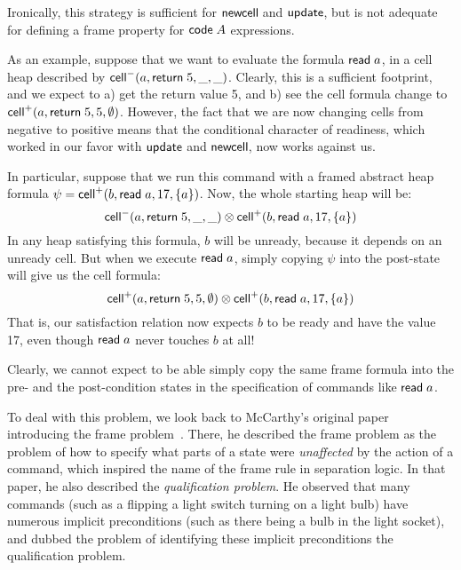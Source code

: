 Ironically, this strategy is sufficient for $\mathsf{newcell}\;$and
$\mathsf{update}$, but is not adequate for defining a frame property
for $\mathsf{code}\;{A}$ expressions. 

As an example, suppose that we want to evaluate the formula $\mathsf{read}\;
a$, in a cell heap described by $\mathsf{cell}^{-}({a}, {\mathsf{return}\; 5}, {\_}, {\_})$.  Clearly,
this is a sufficient footprint, and we expect to a) get the return
value 5, and b) see the cell formula change to $\mathsf{cell}^{+}({a}, {\mathsf{return}\;
  5}, {5}, {\emptyset})$.  However, the fact that we are now changing cells
from negative to positive means that the conditional character of
readiness, which worked in our favor with $\mathsf{update}$ and
$\mathsf{newcell}\;\!\!$, now works against us.

In particular, suppose that we run this command with a framed abstract heap
formula $\psi = \mathsf{cell}^{+}({b}, {\mathsf{read}\; a}, {17}, {\{{a}\}})$. Now, the
whole starting heap will be:
\begin{displaymath}
\mathsf{cell}^{-}({a}, {\mathsf{return}\; 5}, {\_}, {\_}) \otimes \mathsf{cell}^{+}({b}, {\mathsf{read}\; a}, {17}, {\{{a}\}})  
\end{displaymath}
In any heap satisfying this formula, $b$ will be unready, because it depends 
on an unready cell. But when we execute $\mathsf{read}\; a$, simply copying $\psi$ 
into the post-state will give us the cell formula:
\begin{displaymath}
\mathsf{cell}^{+}({a}, {\mathsf{return}\; 5}, {5}, {\emptyset}) \otimes \mathsf{cell}^{+}({b}, {\mathsf{read}\; a}, {17}, {\{{a}\}})
\end{displaymath}
That is, our satisfaction relation now expects $b$ to be ready and have the 
value 17, even though $\mathsf{read}\; a$ never touches $b$ at all!

Clearly, we cannot expect to be able simply copy the same frame formula into 
the pre- and the post-condition states in the specification of commands like 
$\mathsf{read}\; a$. 

To deal with this problem, we look back to McCarthy's original paper
introducing the frame problem~\cite{mccarthy}. There, he described the
frame problem as the problem of how to specify what parts of a state
were \emph{unaffected} by the action of a command, which inspired the
name of the frame rule in separation logic. In that paper, he also
described the \emph{qualification problem}. He observed that many
commands (such as a flipping a light switch turning on a light bulb)
have numerous implicit preconditions (such as there being a bulb in
the light socket), and dubbed the problem of identifying these
implicit preconditions the qualification problem. 

